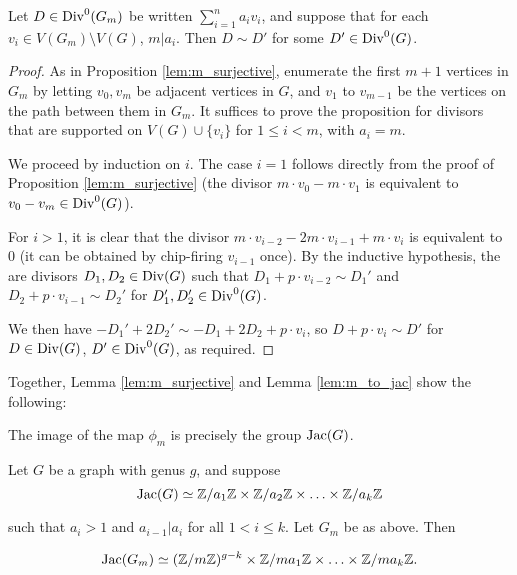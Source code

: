 \documentclass{amsart}
\begin{document}
\begin{lem}
  \label{lem:m_to_jac}
  Let $D \in \operatorname{Div}^0(G_m)$ be written $\sum_{i=1}^na_iv_i$, and suppose
  that for each $v_i \in V(G_m) \setminus V(G)$, $m | a_i$. Then $D
  \sim D'$ for some $D' \in \operatorname{Div}^0(G)$.
\end{lem}
\begin{proof}
  As in Proposition \ref{lem:m_surjective}, enumerate the first $m+1$
  vertices in $G_m$ by letting $v_0, v_m$ be adjacent vertices in $G$,
  and $v_1$ to $v_{m-1}$ be the vertices on the path between them in
  $G_m$. It suffices to prove the proposition for divisors that are
  supported on $V(G) \cup \{v_i\}$ for $1 \le i < m$, with $a_i = m$.

  We proceed by induction on $i$. The case $i=1$ follows directly from
  the proof of Proposition \ref{lem:m_surjective} (the divisor $m
  \cdot v_0 - m \cdot v_1$ is equivalent to $v_0 - v_m \in
  \operatorname{Div}^0(G)$).

  For $i > 1$, it is clear that the divisor $m \cdot v_{i-2} - 2m
  \cdot v_{i-1} + m \cdot v_i$ is equivalent to $0$ (it can be
  obtained by chip-firing $v_{i-1}$ once). By the inductive
  hypothesis, the are divisors $D_1, D_2 \in \operatorname{Div}(G)$ such that $D_1
  + p \cdot v_{i-2} \sim D_1'$ and $D_2 + p \cdot v_{i-1} \sim D_2'$
  for $D_1', D_2' \in \operatorname{Div}^0(G)$.

  We then have $-D_1' + 2D_2' \sim -D_1 + 2D_2 + p \cdot v_i$, so
  $D + p \cdot v_i \sim D'$ for $D \in \operatorname{Div}(G)$, $D' \in \operatorname{Div}^0(G)$,
  as required.
\end{proof}

Together, Lemma \ref{lem:m_surjective} and Lemma \ref{lem:m_to_jac}
show the following:
\begin{cor}
  \label{cor:phi_jac}
  The image of the map $\phi_m$ is precisely the group $\operatorname{Jac}(G)$. 
\end{cor}

\begin{thm}
  \label{thm:subdivide}
  Let $G$ be a graph with genus $g$, and suppose
  \begin{equation*}
    \operatorname{Jac}(G) \simeq \mathbb{Z}/a_1\mathbb{Z} \times \mathbb{Z}/a_2\mathbb{Z} \times \ldots \times \mathbb{Z}/a_k\mathbb{Z}
  \end{equation*}

  such that $a_i > 1$ and $a_{i-1} | a_i$ for all $1 < i \le k$. Let
  $G_m$ be as above. Then

  \begin{equation*}
    \operatorname{Jac}(G_m) \simeq (\mathbb{Z}/m\mathbb{Z})^{g-k} 
    \times \mathbb{Z}/ma_1\mathbb{Z} \times \ldots \times \mathbb{Z}/ma_k\mathbb{Z}.
  \end{equation*}
\end{thm}
\end{document}
